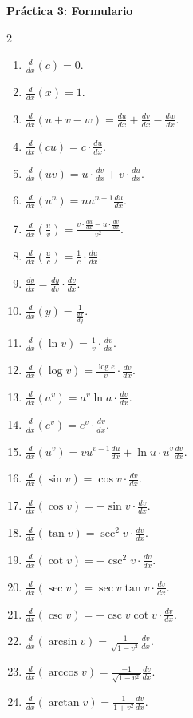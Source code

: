 \documentclass[12pt]{article}
\begin{document}
\begin{center}
    \textbf{\Large Práctica 3: Formulario}
\end{center}

\vspace{1em}

{\footnotesize
\begin{multicols}{2}
\renewcommand{\labelenumi}{\Roman{enumi}.}
\begin{enumerate}
    \item $\displaystyle \frac{d}{dx}(c)=0.$
    \item $\displaystyle \frac{d}{dx}(x)=1.$
    \item $\displaystyle \frac{d}{dx}(u+v-w)=\frac{du}{dx}+\frac{dv}{dx}-\frac{dw}{dx}.$
    \item $\displaystyle \frac{d}{dx}(cu)=c \cdot \frac{du}{dx}.$
    \item $\displaystyle \frac{d}{dx}(uv)=u \cdot \frac{dv}{dx}+v \cdot \frac{du}{dx}.$
    \item $\displaystyle \frac{d}{dx}(u^n)=nu^{n-1} \frac{du}{dx}.$
    \item $\displaystyle \frac{d}{dx}\left(\frac{u}{v}\right)=\frac{v \cdot \frac{du}{dx}-u \cdot \frac{dv}{dx}}{v^2}.$
    \item $\displaystyle \frac{d}{dx}\left(\frac{u}{c}\right)=\frac{1}{c} \cdot \frac{du}{dx}.$
    \item $\displaystyle \frac{dy}{dx}=\frac{dy}{dv} \cdot \frac{dv}{dx}.$
    \item $\displaystyle \frac{d}{dx}(y)=\frac{1}{\frac{dx}{dy}}.$
    \item $\displaystyle \frac{d}{dx}(\ln v)=\frac{1}{v} \cdot \frac{dv}{dx}.$
    \item $\displaystyle \frac{d}{dx}(\log v)=\frac{\log e}{v} \cdot \frac{dv}{dx}.$
    \item $\displaystyle \frac{d}{dx}(a^v)=a^v \ln a \cdot \frac{dv}{dx}.$
    \item $\displaystyle \frac{d}{dx}(e^v)=e^v \cdot \frac{dv}{dx}.$
    \item $\displaystyle \frac{d}{dx}(u^v)=vu^{v-1} \frac{du}{dx} + \ln u \cdot u^v \frac{dv}{dx}.$
    \item $\displaystyle \frac{d}{dx}(\sin v)=\cos v \cdot \frac{dv}{dx}.$
    \item $\displaystyle \frac{d}{dx}(\cos v)=-\sin v \cdot \frac{dv}{dx}.$
    \item $\displaystyle \frac{d}{dx}(\tan v)=\sec^2 v \cdot \frac{dv}{dx}.$
    \item $\displaystyle \frac{d}{dx}(\cot v)=-\csc^2 v \cdot \frac{dv}{dx}.$
    \item $\displaystyle \frac{d}{dx}(\sec v)=\sec v \tan v \cdot \frac{dv}{dx}.$
    \item $\displaystyle \frac{d}{dx}(\csc v)=-\csc v \cot v \cdot \frac{dv}{dx}.$
    \item $\displaystyle \frac{d}{dx}(\arcsin v)=\frac{1}{\sqrt{1-v^2}} \frac{dv}{dx}.$
    \item $\displaystyle \frac{d}{dx}(\arccos v)=\frac{-1}{\sqrt{1-v^2}} \frac{dv}{dx}.$
    \item $\displaystyle \frac{d}{dx}(\arctan v)=\frac{1}{1+v^2} \frac{dv}{dx}.$
    

\end{enumerate}
\end{multicols}}
\end{document}

